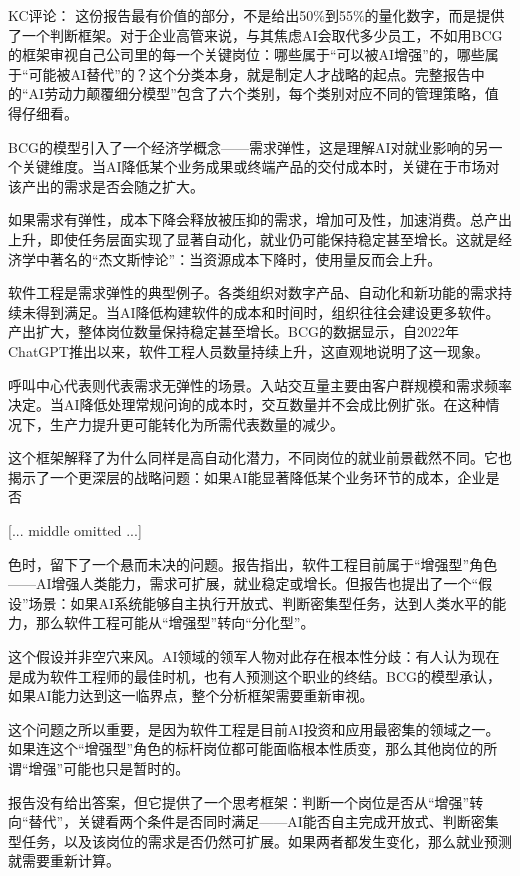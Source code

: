 \documentclass[11pt]{ctexart}
\begin{document}
KC评论： 这份报告最有价值的部分，不是给出50\%到55\%的量化数字，而是提供了一个判断框架。对于企业高管来说，与其焦虑AI会取代多少员工，不如用BCG的框架审视自己公司里的每一个关键岗位：哪些属于“可以被AI增强”的，哪些属于“可能被AI替代”的？这个分类本身，就是制定人才战略的起点。完整报告中的“AI劳动力颠覆细分模型”包含了六个类别，每个类别对应不同的管理策略，值得仔细看。

BCG的模型引入了一个经济学概念——需求弹性，这是理解AI对就业影响的另一个关键维度。当AI降低某个业务成果或终端产品的交付成本时，关键在于市场对该产出的需求是否会随之扩大。

如果需求有弹性，成本下降会释放被压抑的需求，增加可及性，加速消费。总产出上升，即使任务层面实现了显著自动化，就业仍可能保持稳定甚至增长。这就是经济学中著名的“杰文斯悖论”：当资源成本下降时，使用量反而会上升。

软件工程是需求弹性的典型例子。各类组织对数字产品、自动化和新功能的需求持续未得到满足。当AI降低构建软件的成本和时间时，组织往往会建设更多软件。产出扩大，整体岗位数量保持稳定甚至增长。BCG的数据显示，自2022年ChatGPT推出以来，软件工程人员数量持续上升，这直观地说明了这一现象。

呼叫中心代表则代表需求无弹性的场景。入站交互量主要由客户群规模和需求频率决定。当AI降低处理常规问询的成本时，交互数量并不会成比例扩张。在这种情况下，生产力提升更可能转化为所需代表数量的减少。

这个框架解释了为什么同样是高自动化潜力，不同岗位的就业前景截然不同。它也揭示了一个更深层的战略问题：如果AI能显著降低某个业务环节的成本，企业是否

[... middle omitted ...]

色时，留下了一个悬而未决的问题。报告指出，软件工程目前属于“增强型”角色——AI增强人类能力，需求可扩展，就业稳定或增长。但报告也提出了一个“假设”场景：如果AI系统能够自主执行开放式、判断密集型任务，达到人类水平的能力，那么软件工程可能从“增强型”转向“分化型”。

这个假设并非空穴来风。AI领域的领军人物对此存在根本性分歧：有人认为现在是成为软件工程师的最佳时机，也有人预测这个职业的终结。BCG的模型承认，如果AI能力达到这一临界点，整个分析框架需要重新审视。

这个问题之所以重要，是因为软件工程是目前AI投资和应用最密集的领域之一。如果连这个“增强型”角色的标杆岗位都可能面临根本性质变，那么其他岗位的所谓“增强”可能也只是暂时的。

报告没有给出答案，但它提供了一个思考框架：判断一个岗位是否从“增强”转向“替代”，关键看两个条件是否同时满足——AI能否自主完成开放式、判断密集型任务，以及该岗位的需求是否仍然可扩展。如果两者都发生变化，那么就业预测就需要重新计算。
\end{document}
